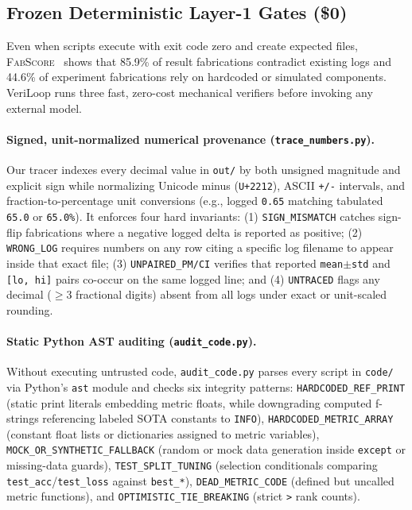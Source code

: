 \subsection{Frozen Deterministic Layer-1 Gates (\$0)}
\label{sec:layer1}

Even when scripts execute with exit code zero and create expected files, \textsc{FabScore}~\citep{chen2026fabscore} shows that 85.9\% of result fabrications contradict existing logs and 44.6\% of experiment fabrications rely on hardcoded or simulated components.
VeriLoop runs three fast, zero-cost mechanical verifiers before invoking any external model.

\paragraph{Signed, unit-normalized numerical provenance (\texttt{trace\_numbers.py}).}
Our tracer indexes every decimal value in \texttt{out/} by both unsigned magnitude and explicit sign while normalizing Unicode minus (\texttt{U+2212}), ASCII \texttt{+/-} intervals, and fraction-to-percentage unit conversions (e.g., logged \texttt{0.65} matching tabulated \texttt{65.0} or \texttt{65.0\%}).
It enforces four hard invariants:
(1) \texttt{SIGN\_MISMATCH} catches sign-flip fabrications where a negative logged delta is reported as positive;
(2) \texttt{WRONG\_LOG} requires numbers on any row citing a specific log filename to appear inside that exact file;
(3) \texttt{UNPAIRED\_PM/CI} verifies that reported \texttt{mean$\pm$std} and \texttt{[lo, hi]} pairs co-occur on the same logged line; and
(4) \texttt{UNTRACED} flags any decimal ($\ge 3$ fractional digits) absent from all logs under exact or unit-scaled rounding.

\paragraph{Static Python AST auditing (\texttt{audit\_code.py}).}
Without executing untrusted code, \texttt{audit\_code.py} parses every script in \texttt{code/} via Python's \texttt{ast} module and checks six integrity patterns:
\texttt{HARDCODED\_REF\_PRINT} (static print literals embedding metric floats, while downgrading computed f-strings referencing labeled SOTA constants to \texttt{INFO}),
\texttt{HARDCODED\_METRIC\_ARRAY} (constant float lists or dictionaries assigned to metric variables),
\texttt{MOCK\_OR\_SYNTHETIC\_FALLBACK} (random or mock data generation inside \texttt{except} or missing-data guards),
\texttt{TEST\_SPLIT\_TUNING} (selection conditionals comparing \texttt{test\_acc}/\texttt{test\_loss} against \texttt{best\_*}),
\texttt{DEAD\_METRIC\_CODE} (defined but uncalled metric functions), and
\texttt{OPTIMISTIC\_TIE\_BREAKING} (strict \texttt{>} rank counts).

